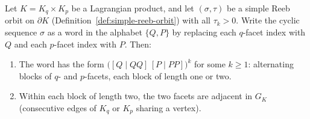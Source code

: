 \begin{lemma}\label{lem:sigma-structure}
Let $K = K_q \times K_p$ be a Lagrangian product, and let
$(\sigma, \tau)$ be a simple Reeb orbit on $\partial K$
(Definition~\ref{def:simple-reeb-orbit}) with all $\tau_k > 0$.
Write the cyclic sequence $\sigma$ as a word in the alphabet
$\{Q, P\}$ by replacing each $q$-facet index with $Q$ and each
$p$-facet index with $P$.
Then:
\begin{enumerate}
\item[(i)] The word has the form
  $\bigl([Q \mid QQ]\,[P \mid PP]\bigr)^k$ for some $k \geq 1$:
  alternating blocks of $q$- and $p$-facets, each block of length
  one or two.

\item[(ii)] Within each block of length two, the two facets are
  adjacent in $G_K$
  (consecutive edges of $K_q$ or $K_p$ sharing a vertex).
\end{enumerate}
\end{lemma}

